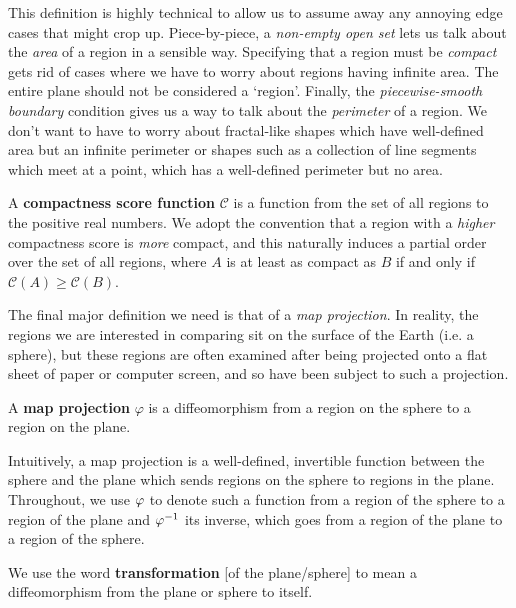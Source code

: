 This definition is highly technical to allow us to assume away any annoying edge 
cases that might crop up.  Piece-by-piece, a \textit{non-empty open set} lets us 
talk about the \textit{area} of a region in a sensible way. Specifying that a region 
must be \textit{compact} gets rid of cases where we have to worry about regions having 
infinite area.  The entire plane should not be considered a `region'.  Finally, the 
\textit{piecewise-smooth boundary} condition gives us a way to talk about the \textit{perimeter} 
of a region.  We don't want to have to worry about fractal-like shapes which have well-defined 
area but an infinite perimeter or shapes such as a collection of line segments which meet at a point, which has a well-defined perimeter but no area.










\begin{definition}
  A \textbf{compactness score function} $\mathcal{C}$ is a function from
  the set of all regions to the positive real numbers.  We adopt the
  convention that a region with a \textit{higher} compactness score is
  \textit{more} compact, and this naturally induces a partial order over
  the set of all regions, where $A$ is at least as compact as $B$ if and
  only if $\mathcal{C}(A)\geq \mathcal{C}(B)$.
\end{definition}

The final major definition we need is that of a \textit{map
projection}.  In reality, the regions we are interested in comparing
sit on the surface of the Earth (i.e. a sphere), but these regions are
often examined after being projected onto a flat sheet of paper or
computer screen, and so have been subject to such a projection.

\begin{definition}
  A \textbf{map projection} $\varphi$ is a 
  diffeomorphism from a region on the sphere to a region on the 
  plane. 
\end{definition}

Intuitively, a map projection is a well-defined, invertible function between the sphere and the plane which sends regions on the sphere to regions in the plane.  Throughout, we use $\varphi$ to denote such a function from a region of the sphere 
to a region of the plane and $\varphi^{-1}$ its inverse, which goes from a region of the plane to a region of the sphere. 

\begin{definition}
  We use the word \textbf{transformation} [of the plane/sphere] to mean
   a diffeomorphism from the plane or sphere to itself.
\end{definition}

